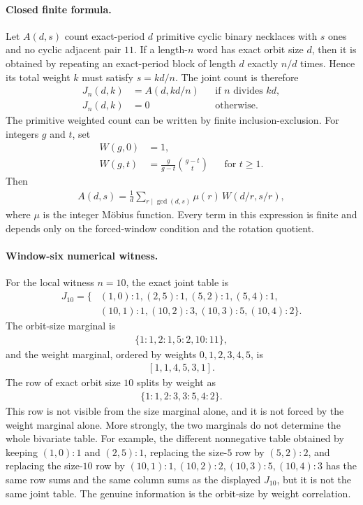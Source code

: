 \paragraph{Closed finite formula.}
Let $A(d,s)$ count exact-period $d$ primitive cyclic binary necklaces with $s$ ones and no cyclic adjacent pair $11$. If a length-$n$ word has exact orbit size $d$, then it is obtained by repeating an exact-period block of length $d$ exactly $n/d$ times. Hence its total weight $k$ must satisfy $s=kd/n$. The joint count is therefore
$$
\begin{aligned}
J_n(d,k)&=A(d,kd/n) &&\text{if } n \text{ divides } kd,\\
J_n(d,k)&=0 &&\text{otherwise.}
\end{aligned}
$$
The primitive weighted count can be written by finite inclusion-exclusion. For integers $g$ and $t$, set
$$
\begin{aligned}
W(g,0)&=1,\\
W(g,t)&=\frac{g}{g-t}\binom{g-t}{t} &&\text{for } t\geq 1.
\end{aligned}
$$
Then
$$
\begin{aligned}
A(d,s)=\frac{1}{d}\sum_{r\mid \gcd(d,s)} \mu(r)\, W(d/r,s/r),
\end{aligned}
$$
where $\mu$ is the integer Möbius function. Every term in this expression is finite and depends only on the forced-window condition and the rotation quotient.

\paragraph{Window-six numerical witness.}
For the local witness $n=10$, the exact joint table is
$$
\begin{aligned}
J_{10}=\{&(1,0):1,(2,5):1,(5,2):1,(5,4):1,\\
&(10,1):1,(10,2):3,(10,3):5,(10,4):2\}.
\end{aligned}
$$
The orbit-size marginal is
$$
\begin{aligned}
\{1:1,2:1,5:2,10:11\},
\end{aligned}
$$
and the weight marginal, ordered by weights $0,1,2,3,4,5$, is
$$
\begin{aligned}
[1,1,4,5,3,1].
\end{aligned}
$$
The row of exact orbit size $10$ splits by weight as
$$
\begin{aligned}
\{1:1,2:3,3:5,4:2\}.
\end{aligned}
$$
This row is not visible from the size marginal alone, and it is not forced by the weight marginal alone. More strongly, the two marginals do not determine the whole bivariate table. For example, the different nonnegative table obtained by keeping $(1,0):1$ and $(2,5):1$, replacing the size-$5$ row by $(5,2):2$, and replacing the size-$10$ row by $(10,1):1,(10,2):2,(10,3):5,(10,4):3$ has the same row sums and the same column sums as the displayed $J_{10}$, but it is not the same joint table. The genuine information is the orbit-size by weight correlation.

